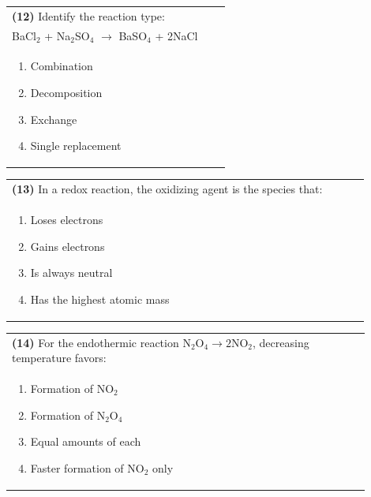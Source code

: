 \documentclass{article}
\begin{document}
\noindent\begin{tabular}{|p{0.9\linewidth}|}
\hline
\textbf{(12)} Identify the reaction type:\\[0.2cm]
BaCl$_2$ + Na$_2$SO$_4$ $\rightarrow$ BaSO$_4$ + 2NaCl\\[0.2cm]
\begin{minipage}[t]{0.85\linewidth}
\begin{enumerate}[label=\alph*.]
\item Combination
\item Decomposition
\item Exchange
\item Single replacement
\end{enumerate}
\end{minipage}\\[0.2cm]
\hline
\end{tabular}

\noindent\begin{tabular}{|p{0.9\linewidth}|}
\hline
\textbf{(13)} In a redox reaction, the oxidizing agent is the species that:\\[0.2cm]
\begin{minipage}[t]{0.85\linewidth}
\begin{enumerate}[label=\alph*.]
\item Loses electrons
\item Gains electrons
\item Is always neutral
\item Has the highest atomic mass
\end{enumerate}
\end{minipage}\\[0.2cm]
\hline
\end{tabular}

\noindent\begin{tabular}{|p{0.9\linewidth}|}
\hline
\textbf{(14)} For the endothermic reaction $\text{N}_2\text{O}_4 \rightarrow 2\text{NO}_2$, decreasing temperature favors: \\[0.2cm]
\begin{minipage}[t]{0.85\linewidth}
\begin{enumerate}[label=\alph*.]
\item Formation of NO$_2$
\item Formation of N$_2$O$_4$
\item Equal amounts of each
\item Faster formation of NO$_2$ only
\end{enumerate}
\end{minipage}\\[0.2cm]
\hline
\end{tabular}
\newpage
\end{document}
